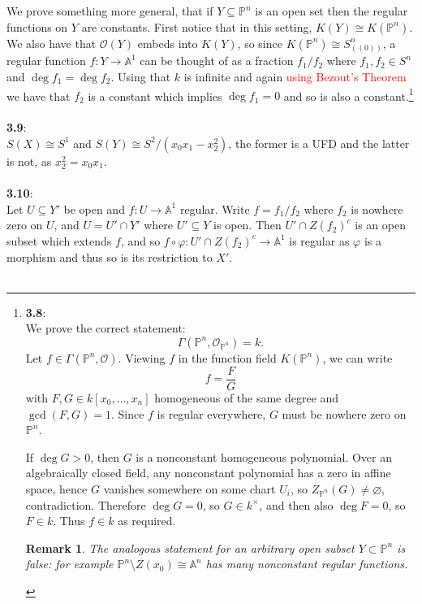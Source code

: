 \documentclass[12pt]{article}
\numberwithin{thm}{subsection}
\numberwithin{defn}{subsection}
\numberwithin{lemma}{subsection}
\numberwithin{example}{subsection}
\numberwithin{notation}{subsection}
\numberwithin{cor}{subsection}
\newtheorem{remark}{Remark}
\numberwithin{remark}{subsection}
\numberwithin{condition}{subsection}
\numberwithin{question}{subsection}
\numberwithin{construction}{subsection}
\numberwithin{construction}{subsection}
\numberwithin{construction}{subsection}
\newcommand{\bb}[1]{\mathbb{#1}}
\newcommand{\call}[1]{\mathcal{#1}}
\newcommand{\lto}{\longrightarrow}
\begin{document}
We prove something more general, that if $Y \subseteq \bb{P}^n$ is an open set then the regular functions on $Y$ are constants. First notice that in this setting, $K(Y) \cong K(\bb{P}^n)$. We also have that $\call{O}(Y)$ embeds into $K(Y)$, so since $K(\bb{P}^n) \cong S^n_{((0))}$, a regular function $f: Y \lto \bb{A}^1$ can be thought of as a fraction $f_1/f_2$ where $f_1,f_2 \in S^n$ and $\operatorname{deg}f_1 = \operatorname{deg}f_2$. Using that $k$ is infinite and again \textcolor{red}{using Bezout's Theorem} we have that $f_2$ is a constant which implies $\operatorname{deg}f_1 = 0$ and so is also a constant.\footnote{\textbf{3.8}:\\
We prove the correct statement:
\[
\Gamma(\bb{P}^n,\mathcal O_{\bb{P}^n})=k.
\]
Let $f\in \Gamma(\bb{P}^n,\mathcal O)$.
Viewing $f$ in the function field $K(\bb{P}^n)$, we can write
\[
f=\frac{F}{G}
\]
with $F,G\in k[x_0,\dots,x_n]$ homogeneous of the same degree and $\gcd(F,G)=1$.
Since $f$ is regular everywhere, $G$ must be nowhere zero on $\bb{P}^n$.

If $\deg G>0$, then $G$ is a nonconstant homogeneous polynomial. Over an algebraically closed field,
any nonconstant polynomial has a zero in affine space, hence $G$ vanishes somewhere on some chart $U_i$,
so $Z_{\bb{P}^n}(G)\neq\varnothing$, contradiction.
Therefore $\deg G=0$, so $G\in k^\times$, and then also $\deg F=0$, so $F\in k$.
Thus $f\in k$ as required.

\begin{remark}
The analogous statement for an arbitrary open subset $Y\subset \bb{P}^n$ is false:
for example $\bb{P}^n\setminus Z(x_0)\cong \bb{A}^n$ has many nonconstant regular functions.
\end{remark}}\\\\
%
\textbf{3.9}:\\
$S(X) \cong S^1$ and $S(Y) \cong S^2/(x_0x_1 - x_2^2)$, the former is a UFD and the latter is not, as $x_2^2 = x_0x_1$.\\\\
%
\textbf{3.10}:\\
Let $U \subseteq Y'$ be open and $f: U \lto \bb{A}^1$ regular. Write $f = f_1/f_2$ where $f_2$ is nowhere zero on $U$, and $U = U' \cap Y'$ where $U' \subseteq Y$ is open. Then $U' \cap Z(f_2)^c$ is an open subset which extends $f$, and so $f \circ \varphi: U' \cap Z(f_2)^c \lto \bb{A}^1$ is regular as $\varphi$ is a morphism and thus so is its restriction to $X'$.\\\\
\end{document}

